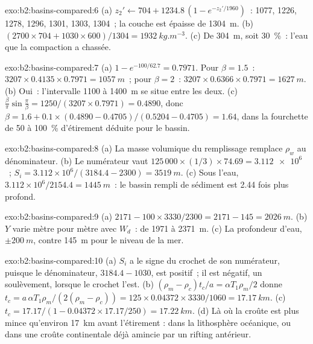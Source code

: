 \begin{solution}{exo:b2:basins-compared:6}
(a) $z_2' \leftarrow 704 + 1234.8\,(1 - e^{-z_2'/1960})$~: 1077, 1226, 1278, 1296, 1301, 1303,
1304~; la couche est épaisse de \qty{1304}{m}. (b) $(2700\times704 + 1030\times600)/1304 =
\qty{1932}{kg.m^{-3}}$. (c) De \qty{304}{m}, soit \qty{30}{\percent}~: l'eau que la compaction
a chassée.
\end{solution}

\begin{solution}{exo:b2:basins-compared:7}
(a) $1 - e^{-100/62.7} = 0.7971$. Pour $\beta = 1.5$~: $3207\times0.4135\times0.7971 =
\qty{1057}{m}$~; pour $\beta = 2$~: $3207\times0.6366\times0.7971 = \qty{1627}{m}$. (b) Oui~: l'intervalle 1100 à
\qty{1400}{m} se situe entre les deux. (c) $\frac{\beta}{\pi}\sin\frac{\pi}{\beta} = 1250/(3207\times0.7971)
= 0.4890$, donc $\beta = 1.6 + 0.1\times(0.4890 - 0.4705)/(0.5204 - 0.4705) = 1.64$, dans la
fourchette de 50 à \qty{100}{\percent} d'étirement déduite pour le bassin.
\end{solution}

\begin{solution}{exo:b2:basins-compared:8}
(a) La masse volumique du remplissage remplace $\rho_w$ au dénominateur. (b) Le numérateur vaut
$125\,000\times(1/3)\times74.69 = \num{3.112e6}$~; $S_i = 3.112\times10^{6}/(3184.4 - 2300) =
\qty{3519}{m}$. (c) Sous l'eau, $3.112\times10^{6}/2154.4 = \qty{1445}{m}$~: le bassin rempli de sédiment est
2.44 fois plus profond.
\end{solution}

\begin{solution}{exo:b2:basins-compared:9}
(a) $2171 - 100\times3330/2300 = 2171 - 145 = \qty{2026}{m}$. (b) $Y$ varie mètre pour mètre
avec $W_d$~: de 1971 à \qty{2371}{m}. (c) La profondeur d'eau, $\pm\qty{200}{m}$, contre
\qty{145}{m} pour le niveau de la mer.
\end{solution}

\begin{solution}{exo:b2:basins-compared:10}
(a) $S_i$ a le signe du crochet de son numérateur, puisque le dénominateur, $3184.4 - 1030$, est
positif~; il est négatif, un soulèvement, lorsque le crochet l'est. (b) $(\rho_m - \rho_c)t_c/a =
\alpha T_1\rho_m/2$ donne $t_c = a\,\alpha T_1\rho_m/(2(\rho_m - \rho_c)) = 125\times0.04372\times
3330/1060 = \qty{17.17}{km}$. (c) $t_c = 17.17/(1 - 0.04372\times17.17/250) = \qty{17.22}{km}$.
(d) Là où la croûte est plus mince qu'environ \qty{17}{km} avant l'étirement : dans la lithosphère océanique,
ou dans une croûte continentale déjà amincie par un rifting antérieur.
\end{solution}

